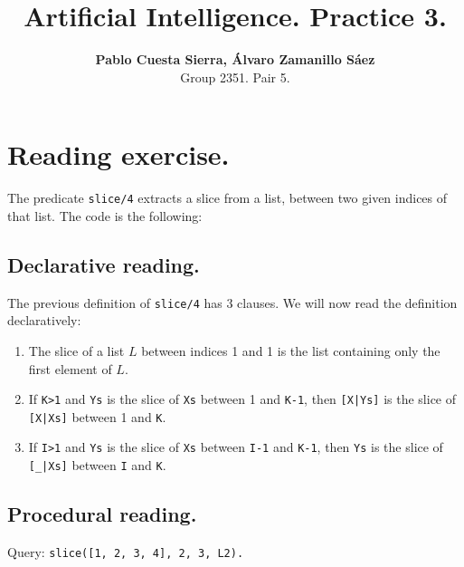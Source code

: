 \documentclass{article}
\title{\textbf{Artificial Intelligence. Practice 3.}}
\author{\textbf{Pablo Cuesta Sierra, Álvaro Zamanillo Sáez} \\Group 2351. Pair 5.}
\begin{document}
{
    \maketitle
}

\tableofcontents

\newpage
\section{Reading exercise.}

The predicate \texttt{slice/4} extracts a slice from a list, between two given indices of that list. The code is the following:



\subsection{Declarative reading.}

The previous definition of \texttt{slice/4} has 3 clauses. We will now read the definition declaratively:

\begin{enumerate}
    \item The slice of a list $L$ between indices 1 and 1 is the list containing only the first element of $L$.
    \item If \texttt{K>1} and \texttt{Ys} is the slice of \texttt{Xs} between 1 and \texttt{K-1}, then \texttt{[X|Ys]} is the slice of \texttt{[X|Xs]} between 1 and \texttt{K}.
    \item If \texttt{I>1} and \texttt{Ys} is the slice of \texttt{Xs} between \texttt{I-1} and \texttt{K-1}, then \texttt{Ys} is the slice of \texttt{[\_|Xs]} between \texttt{I} and \texttt{K}.
\end{enumerate}

\subsection{Procedural reading.}

Query: \texttt{slice([1, 2, 3, 4], 2, 3, L2).}
\end{document}
